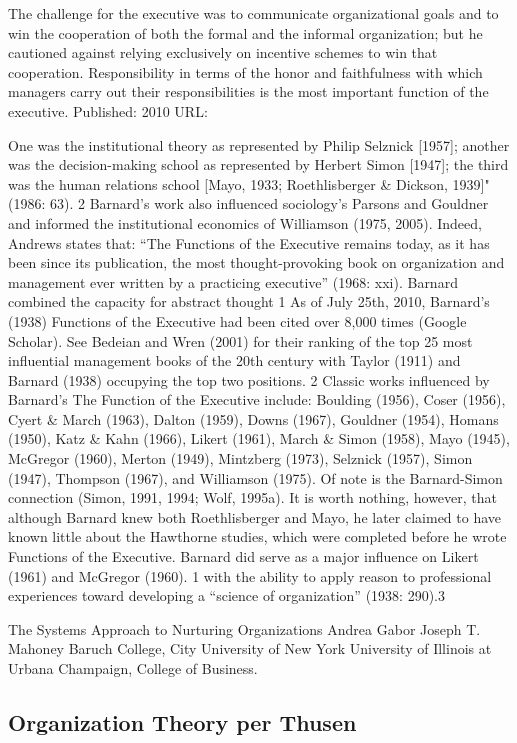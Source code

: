 The challenge for the executive was to communicate organizational goals and to win the cooperation of both the formal and the informal organization; but he cautioned against relying exclusively on incentive schemes to win that cooperation. Responsibility in terms of the honor and faithfulness with which managers carry out their responsibilities is the most important function of the executive. Published: 2010 URL: 

One was the institutional theory as represented by Philip Selznick [1957]; another was the decision-making school as represented by Herbert Simon [1947]; the third was the human relations school [Mayo, 1933; Roethlisberger \& Dickson, 1939]" (1986: 63). 2 Barnard’s work also influenced sociology’s Parsons and Gouldner and informed the institutional economics of Williamson (1975, 2005). Indeed, Andrews states that: ``The Functions of the Executive remains today, as it has been since its publication, the most thought-provoking book on organization and management ever written by a practicing executive'' (1968: xxi). Barnard combined the capacity for abstract thought 1 As of July 25th, 2010, Barnard’s (1938) Functions of the Executive had been cited over 8,000 times (Google Scholar). See Bedeian and Wren (2001) for their ranking of the top 25 most influential management books of the 20th century with Taylor (1911) and Barnard (1938) occupying the top two positions. 2 Classic works influenced by Barnard’s The Function of the Executive include: Boulding (1956), Coser (1956), Cyert \& March (1963), Dalton (1959), Downs (1967), Gouldner (1954), Homans (1950), Katz \& Kahn (1966), Likert (1961), March \& Simon (1958), Mayo (1945), McGregor (1960), Merton (1949), Mintzberg (1973), Selznick (1957), Simon (1947), Thompson (1967), and Williamson (1975). Of note is the Barnard-Simon connection (Simon, 1991, 1994; Wolf, 1995a). It is worth nothing, however, that although Barnard knew both Roethlisberger and Mayo, he later claimed to have known little about the Hawthorne studies, which were completed before he wrote Functions of the Executive. Barnard did serve as a major influence on Likert (1961) and McGregor (1960). 1 with the ability to apply reason to professional experiences toward developing a ``science of organization'' (1938: 290).3

The Systems Approach to Nurturing Organizations Andrea Gabor Joseph T. Mahoney Baruch College, City University of New York University of Illinois at Urbana Champaign, College of Business.
    
\subsection{Organization Theory per Thusen}

